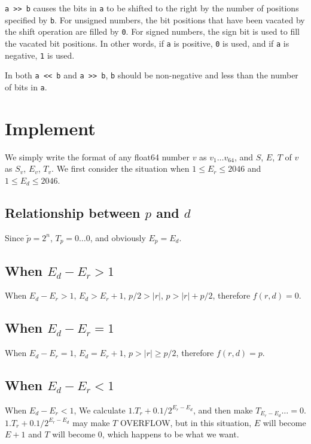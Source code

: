 \documentclass[a4paper,12pt]{article}
\begin{document}
    \verb|a >> b| causes the bits in \verb|a| to be shifted to the right by the number of positions specified by \verb|b|. For unsigned numbers, the bit positions that have been vacated by the shift operation are filled by \verb|0|. For signed numbers, the sign bit is used to fill the vacated bit positions. In other words, if \verb|a| is positive, \verb|0| is used, and if \verb|a| is negative, \verb|1| is used.

    In both \verb|a << b| and \verb|a >> b|, \verb|b| should be non-negative and less than the number of bits in \verb|a|.

    \section{Implement}\label{sec:implement}

    We simply write the format of any float64 number $v$ as $v_1\dots v_{64}$, and $S$, $E$, $T$ of $v$ as $S_v$, $E_v$, $T_v$. We first consider the situation when $1\leq E_r\leq2046$ and $1\leq E_d\leq2046$.

    \subsection{Relationship between $p$ and $d$}

    Since $\tilde{p}=2^n$, $T_p=0\dots0$, and obviously $E_p=E_d$.

    \subsection{When $E_d-E_r>1$}

    When $E_d-E_r>1$, $E_d>E_r+1$, $p/2>\left\lvert r\right\rvert$, $p>\left\lvert r\right\rvert+p/2$, therefore $f(r,d)=0$.

    \subsection{When $E_d-E_r=1$}

    When $E_d-E_r=1$, $E_d=E_r+1$, $p>\left\lvert r\right\rvert\geq p/2$, therefore $f(r,d)=p$.

    \subsection{When $E_d-E_r<1$}

    When $E_d-E_r<1$, We calculate $1.T_r+0.1/2^{E_r-E_d}$, and then make $T_{E_r-E_d}\dots=0$. $1.T_r+0.1/2^{E_r-E_d}$ may make $T$ OVERFLOW, but in this situation, $E$ will become $E+1$ and $T$ will become $0$, which happens to be what we want.
\end{document}
